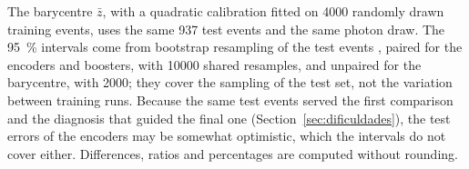 The barycentre $\bar{z}$, with a quadratic calibration fitted on \num{4000} randomly drawn training events, uses the same \num{937} test events and the same photon draw. The \qty{95}{\percent} intervals come from bootstrap resampling of the test events \citep{efron1979bootstrap}, paired for the encoders and boosters, with \num{10000} shared resamples, and unpaired for the barycentre, with \num{2000}; they cover the sampling of the test set, not the variation between training runs. Because the same test events served the first comparison and the diagnosis that guided the final one (Section~\ref{sec:dificuldades}), the test errors of the encoders may be somewhat optimistic, which the intervals do not cover either. Differences, ratios and percentages are computed without rounding.
